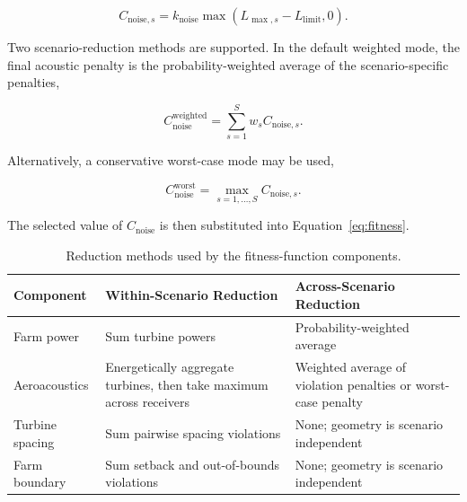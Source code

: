 \documentclass[11pt]{article}
\begin{document}
\begin{equation}
    C_{\mathrm{noise},s}
    =
    k_{\mathrm{noise}}
    \max
    \left(
        L_{\max,s}
        -
        L_{\mathrm{limit}},
        0
    \right).
    \label{eq:scenario-noise-penalty}
\end{equation}

Two scenario-reduction methods are supported. In the default weighted mode, the final acoustic penalty is the probability-weighted average of the scenario-specific penalties,

\begin{equation}
    C_{\mathrm{noise}}^{\mathrm{weighted}}
    =
    \sum_{s=1}^{S}
    w_s
    C_{\mathrm{noise},s}.
    \label{eq:weighted-noise-penalty}
\end{equation}

Alternatively, a conservative worst-case mode may be used,

\begin{equation}
    C_{\mathrm{noise}}^{\mathrm{worst}}
    =
    \max_{s=1,\ldots,S}
    C_{\mathrm{noise},s}.
    \label{eq:worst-noise-penalty}
\end{equation}

The selected value of $C_{\mathrm{noise}}$ is then substituted into Equation~\ref{eq:fitness}.

\begin{table}[htbp]
    \centering
    \caption{Reduction methods used by the fitness-function components.}
    \label{tab:fitness-reductions}

    \begin{tabularx}{\textwidth}{
        >{\raggedright\arraybackslash}p{}
        >{\raggedright\arraybackslash}X
        >{\raggedright\arraybackslash}X
    }
        \toprule
        \textbf{Component}
        & \textbf{Within-Scenario Reduction}
        & \textbf{Across-Scenario Reduction} \\
        \midrule

        Farm power
        & Sum turbine powers
        & Probability-weighted average \\

        Aeroacoustics
        & Energetically aggregate turbines, then take maximum across receivers
        & Weighted average of violation penalties or worst-case penalty \\

        Turbine spacing
        & Sum pairwise spacing violations
        & None; geometry is scenario independent \\

        Farm boundary
        & Sum setback and out-of-bounds violations
        & None; geometry is scenario independent \\

        \bottomrule
    \end{tabularx}
\end{table}
\end{document}
